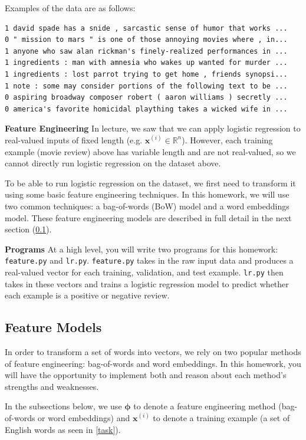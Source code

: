 \documentclass[11pt,addpoints,answers]{exam}
\newcommand{\xv}{\mathbf{x}}
\begin{document}
Examples of the data are as follows:
 
\begin{lstlisting}
1 david spade has a snide , sarcastic sense of humor that works ... 
0 " mission to mars " is one of those annoying movies where , in...
1 anyone who saw alan rickman's finely-realized performances in ...
1 ingredients : man with amnesia who wakes up wanted for murder ...
1 ingredients : lost parrot trying to get home , friends synopsi... 
1 note : some may consider portions of the following text to be ...
0 aspiring broadway composer robert ( aaron williams ) secretly ...
0 america's favorite homicidal plaything takes a wicked wife in ...
\end{lstlisting}

{\bf Feature Engineering } 
In lecture, we saw that we can apply logistic regression to real-valued inputs of fixed length (e.g. $\xv^{(i)}\in\mathbb{R}^n$). However, each training example (movie review) above has variable length and are not real-valued, so we cannot directly run logistic regression on the dataset above.

To be able to run logistic regression on the dataset, we first need to transform it using some basic feature engineering techniques. In this homework, we will use two common techniques: a bag-of-words (BoW) model and a word embeddings model. These feature engineering models are described in full detail in the next section (\ref{featuremodels}).

{\bf Programs } 
At a high level, you will write two programs for this homework: \texttt{feature.py} and \texttt{lr.py}. \texttt{feature.py} takes in the raw input data and produces a real-valued vector for each training, validation, and test example. \texttt{lr.py} then takes in these vectors and trains a logistic regression model to predict whether each example is a positive or negative review.


\subsection{Feature Models}\label{featuremodels}
In order to transform a set of words into vectors, we rely on two popular methods of feature engineering: bag-of-words and word embeddings. In this homework, you will have the opportunity to implement both and reason about each method's strengths and weaknesses.

In the subsections below, we use $\boldsymbol{\phi}$ to denote a feature engineering method (bag-of-words or word embeddings) and  $\xv^{(i)}$ to denote a training example (a set of English words as seen in \ref{task}).
\end{document}
